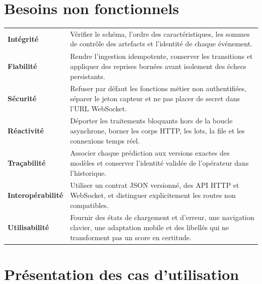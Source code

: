 \noindent\begin{minipage}{\textwidth}
\section{Besoins non fonctionnels}

\begin{center}
  \captionsetup{type=table}
  \label{tab:non-functional-requirements}
  \renewcommand{\arraystretch}{1.22}
  \begin{tabularx}{\textwidth}{@{}>{\bfseries\color{PremiumEmerald}}p{}Y@{}}
    Int\'egrit\'e & V\'erifier le sch\'ema, l'ordre des caract\'eristiques, les sommes de contr\^ole des artefacts et l'identit\'e de chaque \'ev\'enement. \\
    Fiabilit\'e & Rendre l'ingestion idempotente, conserver les transitions et appliquer des reprises born\'ees avant isolement des échecs persistants. \\
    S\'ecurit\'e & Refuser par d\'efaut les fonctions m\'etier non authentifi\'ees, s\'eparer le jeton capteur et ne pas placer de secret dans l'URL WebSocket. \\
    R\'eactivit\'e & D\'eporter les traitements bloquants hors de la boucle asynchrone, borner les corps HTTP, les lots, la file et les connexions temps r\'eel. \\
    Tra\c{c}abilit\'e & Associer chaque pr\'ediction aux versions exactes des mod\`eles et conserver l'identit\'e valid\'ee de l'op\'erateur dans l'historique. \\
    Interop\'erabilit\'e & Utiliser un contrat JSON versionn\'e, des API HTTP et WebSocket, et distinguer explicitement les routes non compatibles. \\
    Utilisabilit\'e & Fournir des \'etats de chargement et d'erreur, une navigation clavier, une adaptation mobile et des libell\'es qui ne transforment pas un score en certitude. \\
  \end{tabularx}
\end{center}
\end{minipage}

\section{Pr\'esentation des cas d'utilisation}

